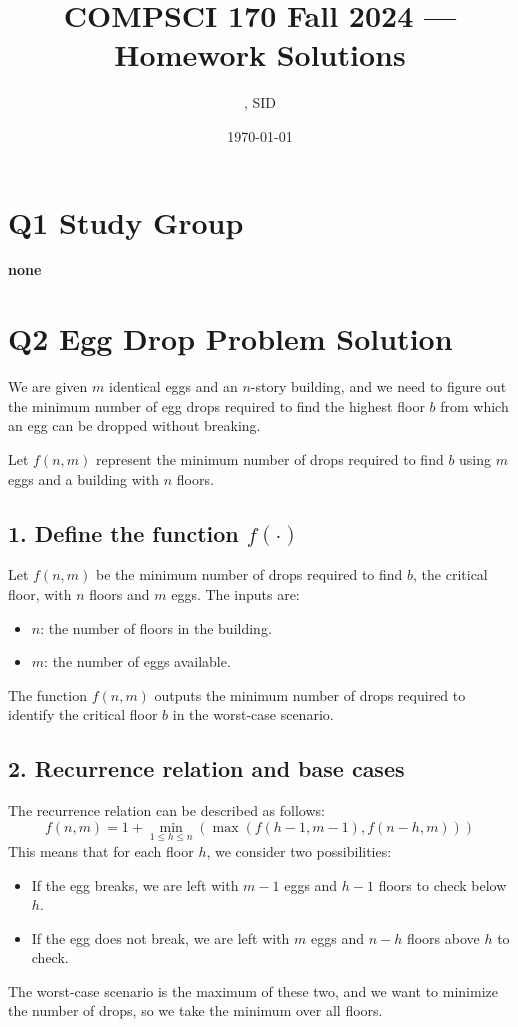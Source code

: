 \documentclass[11pt]{article}
\title{COMPSCI 170 Fall 2024 --- Homework \Homework Solutions}
\author{\Name, SID \SID}
\date{\today}
\begin{document}
\maketitle

\section*{Q1 Study Group}

\textbf{none}



\newpage


\section*{Q2 Egg Drop Problem Solution}

We are given \( m \) identical eggs and an \( n \)-story building, and we need to figure out the minimum number of egg drops required to find the highest floor \( b \) from which an egg can be dropped without breaking.

Let \( f(n, m) \) represent the minimum number of drops required to find \( b \) using \( m \) eggs and a building with \( n \) floors.

\subsection*{1. Define the function \( f(\cdot) \)}
Let \( f(n, m) \) be the minimum number of drops required to find \( b \), the critical floor, with \( n \) floors and \( m \) eggs. 
The inputs are:
\begin{itemize}
    \item \( n \): the number of floors in the building.
    \item \( m \): the number of eggs available.
\end{itemize}
The function \( f(n, m) \) outputs the minimum number of drops required to identify the critical floor \( b \) in the worst-case scenario.

\subsection*{2. Recurrence relation and base cases}
The recurrence relation can be described as follows:
\[
f(n, m) = 1 + \min_{1 \leq h \leq n} \left( \max(f(h-1, m-1), f(n-h, m)) \right)
\]
This means that for each floor \( h \), we consider two possibilities:
\begin{itemize}
    \item If the egg breaks, we are left with \( m-1 \) eggs and \( h-1 \) floors to check below \( h \).
    \item If the egg does not break, we are left with \( m \) eggs and \( n-h \) floors above \( h \) to check.
\end{itemize}
The worst-case scenario is the maximum of these two, and we want to minimize the number of drops, so we take the minimum over all floors.
\end{document}
